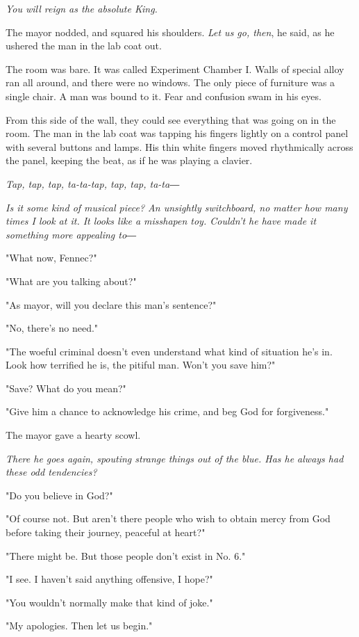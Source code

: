 \emph{You will reign as the absolute King.}

The mayor nodded, and squared his shoulders. \emph{Let us go, then}, he said,
as he ushered the man in the lab coat out.

The room was bare. It was called Experiment Chamber I. Walls of special
alloy ran all around, and there were no windows. The only piece of
furniture was a single chair. A man was bound to it. Fear and confusion
swam in his eyes.

From this side of the wall, they could see everything that was going on
in the room. The man in the lab coat was tapping his fingers lightly on
a control panel with several buttons and lamps. His thin white fingers
moved rhythmically across the panel, keeping the beat, as if he was
playing a clavier.

\emph{Tap, tap, tap, ta-ta-tap, tap, tap, ta-ta―}

\emph{Is it some kind of musical piece? An unsightly switchboard, no matter
how many times I look at it. It looks like a misshapen toy. Couldn't he
have made it something more appealing to―}

"What now, Fennec?"

"What are you talking about?"

"As mayor, will you declare this man's sentence?"

"No, there's no need."

"The woeful criminal doesn't even understand what kind of situation he's
in. Look how terrified he is, the pitiful man. Won't you save him?"

"Save? What do you mean?"

"Give him a chance to acknowledge his crime, and beg God for
forgiveness."

The mayor gave a hearty scowl.

\emph{There he goes again, spouting strange things out of the blue. Has he
always had these odd tendencies?}

"Do you believe in God?"

"Of course not. But aren't there people who wish to obtain mercy from
God before taking their journey, peaceful at heart?"

"There might be. But those people don't exist in No. 6."

"I see. I haven't said anything offensive, I hope?"

"You wouldn't normally make that kind of joke."

"My apologies. Then let us begin."

